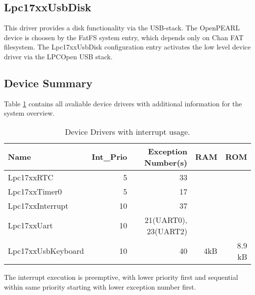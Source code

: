 \subsection{Lpc17xxUsbDisk}
This driver provides a disk functionality via the USB-stack.
The OpenPEARL device is choosen by the FatFS system entry, which 
depends only on Chan FAT filesystem.
The Lpc17xxUsbDisk configuration entry
activates the low level device driver via the LPCOpen USB stack.

\subsection{Device Summary}
Table \ref{lpc17_device_list} contains all avaliable device drivers 
with additional information for the system overview.

\begin{table}
\begin{tabular}{|l|r|r|r|r|}
\hline
Name             & Int\_Prio & Exception Number(s) & RAM & ROM \\
\hline
Lpc17xxRTC       &  5 & 33 \\ 
Lpc17xxTimer0    &  5 &  17 \\
Lpc17xxInterrupt & 10 &  37 \\
Lpc17xxUart      & 10 &  21(UART0), 23(UART2) \\ 
Lpc17xxUsbKeyboard  & 10 &  40 & 4kB & 8.9 kB \\ 
\hline
\end{tabular}
\caption{Device Drivers with interrupt usage.}
\label{lpc17_device_list}
\end{table}

The interrupt execution is preemptive, with lower priority first and 
sequential within same priority starting with lower exception number first.

